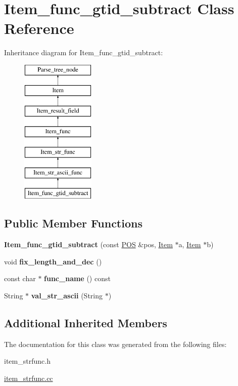\hypertarget{classItem__func__gtid__subtract}{}\section{Item\+\_\+func\+\_\+gtid\+\_\+subtract Class Reference}
\label{classItem__func__gtid__subtract}
Inheritance diagram for Item\+\_\+func\+\_\+gtid\+\_\+subtract\+:\begin{figure}[H]
\begin{center}
\leavevmode
\includegraphics[height=7.000000cm]{classItem__func__gtid__subtract}
\end{center}
\end{figure}
\subsection*{Public Member Functions}
\begin{DoxyCompactItemize}
\item 
\mbox{\label{classItem__func__gtid__subtract_a89c33d68d06ea6d35d50986f5f4cdb18}} 
{\bfseries Item\+\_\+func\+\_\+gtid\+\_\+subtract} (const \mbox{\hyperlink{structYYLTYPE}{P\+OS}} \&pos, \mbox{\hyperlink{classItem}{Item}} $\ast$a, \mbox{\hyperlink{classItem}{Item}} $\ast$b)
\item 
\mbox{\label{classItem__func__gtid__subtract_ac6e68a74031785e2f59f47436756c931}} 
void {\bfseries fix\+\_\+length\+\_\+and\+\_\+dec} ()
\item 
\mbox{\label{classItem__func__gtid__subtract_a9fb41cf6a8f6f88fde88d65cac5dc4a4}} 
const char $\ast$ {\bfseries func\+\_\+name} () const
\item 
\mbox{\label{classItem__func__gtid__subtract_ae78d11b3f4d116e759e41931a33a7f12}} 
String $\ast$ {\bfseries val\+\_\+str\+\_\+ascii} (String $\ast$)
\end{DoxyCompactItemize}
\subsection*{Additional Inherited Members}


The documentation for this class was generated from the following files\+:\begin{DoxyCompactItemize}
\item 
item\+\_\+strfunc.\+h\item 
\mbox{\hyperlink{item__strfunc_8cc}{item\+\_\+strfunc.\+cc}}\end{DoxyCompactItemize}
